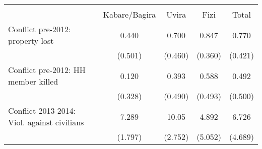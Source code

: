 \begin{tabular}{l*{4}{c}} \hline\hline
                    &\multicolumn{4}{c}{}                               \\
                    &Kabare/Bagira&       Uvira&        Fizi&       Total\\
\hline
Conflict pre-2012: property lost&       0.440&       0.700&       0.847&       0.770\\
                    &     (0.501)&     (0.460)&     (0.360)&     (0.421)\\
[1em]
Conflict pre-2012: HH member killed&       0.120&       0.393&       0.588&       0.492\\
                    &     (0.328)&     (0.490)&     (0.493)&     (0.500)\\
[1em]
Conflict 2013-2014: Viol. against civilians&       7.289&       10.05&       4.892&       6.726\\
                    &     (1.797)&     (2.752)&     (5.052)&     (4.689)\\
\hline\hline
\end{tabular}

